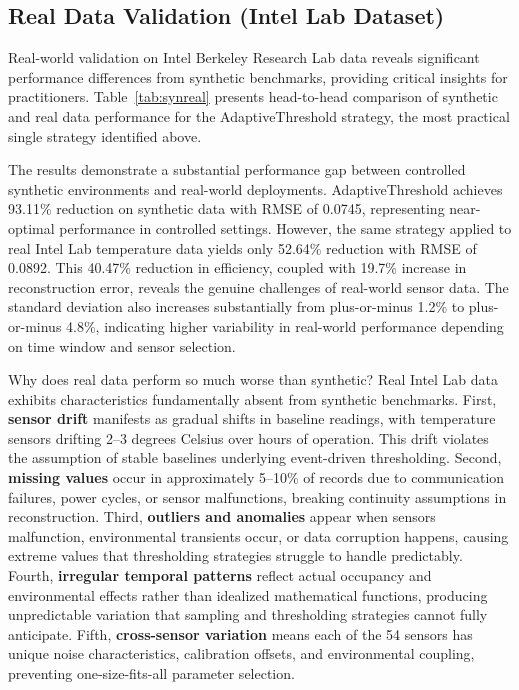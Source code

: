 \documentclass[10pt,twocolumn]{article}
\begin{document}
\vspace{0.15cm}

\subsection{Real Data Validation (Intel Lab Dataset)}

Real-world validation on Intel Berkeley Research Lab data reveals significant performance differences from synthetic benchmarks, providing critical insights for practitioners. Table~\ref{tab:synreal} presents head-to-head comparison of synthetic and real data performance for the AdaptiveThreshold strategy, the most practical single strategy identified above.

The results demonstrate a substantial performance gap between controlled synthetic environments and real-world deployments. AdaptiveThreshold achieves 93.11\% reduction on synthetic data with RMSE of 0.0745, representing near-optimal performance in controlled settings. However, the same strategy applied to real Intel Lab temperature data yields only 52.64\% reduction with RMSE of 0.0892. This 40.47\% reduction in efficiency, coupled with 19.7\% increase in reconstruction error, reveals the genuine challenges of real-world sensor data. The standard deviation also increases substantially from plus-or-minus 1.2\% to plus-or-minus 4.8\%, indicating higher variability in real-world performance depending on time window and sensor selection.

Why does real data perform so much worse than synthetic? Real Intel Lab data exhibits characteristics fundamentally absent from synthetic benchmarks. First, \textbf{sensor drift} manifests as gradual shifts in baseline readings, with temperature sensors drifting 2--3 degrees Celsius over hours of operation. This drift violates the assumption of stable baselines underlying event-driven thresholding. Second, \textbf{missing values} occur in approximately 5--10\% of records due to communication failures, power cycles, or sensor malfunctions, breaking continuity assumptions in reconstruction. Third, \textbf{outliers and anomalies} appear when sensors malfunction, environmental transients occur, or data corruption happens, causing extreme values that thresholding strategies struggle to handle predictably. Fourth, \textbf{irregular temporal patterns} reflect actual occupancy and environmental effects rather than idealized mathematical functions, producing unpredictable variation that sampling and thresholding strategies cannot fully anticipate. Fifth, \textbf{cross-sensor variation} means each of the 54 sensors has unique noise characteristics, calibration offsets, and environmental coupling, preventing one-size-fits-all parameter selection.
\end{document}
